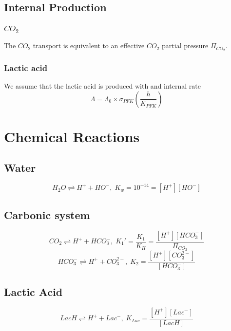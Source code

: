 \documentclass{revtex4}
\begin{document}
\subsection{Internal Production}

\subsubsection{$CO_2$}
The $CO_2$ transport is equivalent to an effective $CO_2$ partial pressure $\Pi_{CO_2}$.

\subsubsection{Lactic acid}
We assume that the lactic acid is produced with and internal rate
\begin{equation}
	\Lambda = \Lambda_0 \times \sigma_{PFK}\left(\dfrac{h}{K_{PFK}}\right)
\end{equation}

\section{Chemical Reactions}

\subsection{Water}
\begin{equation}
	H_2O \rightleftharpoons H^+ + HO^-, \; K_w = 10^{-14} = \left[H^+\right]\left[HO^-\right]
\end{equation}	

\subsection{Carbonic system}
\begin{equation}
	CO_2 \rightleftharpoons H^+ + HCO_3^-, \; K_1' = \dfrac{K_1}{K_H} = \dfrac{\left[H^+\right]\left[HCO_3^-\right]}{\Pi_{CO_2}}
\end{equation}
\begin{equation}
	HCO_3^- \rightleftharpoons H^+ + CO_3^{2-}, \; K_2  = \dfrac{\left[H^+\right]\left[CO_3^{2-}\right]}{\left[HCO_3^-\right]}
\end{equation}
\subsection{Lactic Acid}
\begin{equation}
	LacH \rightleftharpoons H^+ + Lac^-, \; K_{Lac} = \dfrac{\left[H^+\right]\left[Lac^-\right]}{\left[LacH\right]}
\end{equation}
\end{document}

